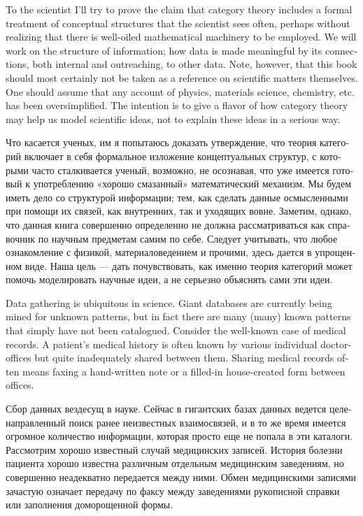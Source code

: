 \documentclass{book}
\theoremstyle{theoremENG}
\theoremstyle{lemmaENG}
\theoremstyle{propositionENG}
\theoremstyle{corollaryENG}
\theoremstyle{factENG}
\theoremstyle{remarkENG}
\theoremstyle{exampleENG}
\theoremstyle{warningENG}
\theoremstyle{questionENG}
\theoremstyle{guessENG}
\theoremstyle{answerENG}
\theoremstyle{constructionENG}
\theoremstyle{rulesENG}
\theoremstyle{excENG}
\theoremstyle{appENG}
\theoremstyle{definitionENG}
\theoremstyle{notationENG}
\theoremstyle{conjectureENG}
\theoremstyle{postulateENG}
\theoremstyle{theoremRUS}
\theoremstyle{lemmaRUS}
\theoremstyle{propositionRUS}
\theoremstyle{corollaryRUS}
\theoremstyle{factRUS}
\theoremstyle{remarkRUS}
\theoremstyle{exampleRUS}
\theoremstyle{warningRUS}
\theoremstyle{questionRUS}
\theoremstyle{guessRUS}
\theoremstyle{answerRUS}
\theoremstyle{constructionRUS}
\theoremstyle{rulesRUS}
\theoremstyle{excRUS}
\theoremstyle{appRUS}
\theoremstyle{definitionRUS}
\theoremstyle{notationRUS}
\theoremstyle{conjectureRUS}
\theoremstyle{postulateRUS}
\begin{document}
\begin{english}
To the scientist I'll try to prove the claim that category theory includes a formal treatment of conceptual structures that the scientist sees often, perhaps without realizing that there is well-oiled mathematical machinery to be employed. We will work on the structure of information; how data is made meaningful by its connections, both internal and outreaching, to other data. Note, however, that this book should most certainly not be taken as a reference on scientific matters themselves. One should assume that any account of physics, materials science, chemistry, etc. has been oversimplified. The intention is to give a flavor of how category theory may help us model scientific ideas, not to explain these ideas in a serious way.

\begin{russian}Что касается ученых, им я попытаюсь доказать утверждение, что теория категорий включает в себя формальное изложение концептуальных структур, с которыми часто сталкивается ученый, возможно, не осознавая, что уже имеется готовый к употреблению «хорошо смазанный» математический механизм. Мы будем иметь дело со структурой информации; тем, как сделать данные осмысленными при помощи их связей, как внутренних, так и уходящих вовне. Заметим, однако, что данная книга совершенно определенно не должна рассматриваться как справочник по научным предметам самим по себе. Следует учитывать, что любое ознакомление с физикой, материаловедением и прочими, здесь дается в упрощенном виде. Наша цель — дать почувствовать, как именно теория категорий может помочь моделировать научные идеи, а не серьезно объяснять сами эти идеи. \end{russian}

Data gathering is ubiquitous in science. Giant databases are currently being mined for unknown patterns, but in fact there are many (many) known patterns that simply have not been catalogued. Consider the well-known case of medical records. A patient's medical history is often known by various individual doctor-offices but quite inadequately shared between them. Sharing medical records often means faxing a hand-written note or a filled-in house-created form between offices.

\begin{russian}Сбор данных вездесущ в науке. Сейчас в гигантских базах данных ведется целенаправленный поиск ранее неизвестных взаимосвязей, и в то же время имеется огромное количество информации, которая просто еще не попала в эти каталоги. Рассмотрим хорошо известный случай медицинских записей. История болезни пациента хорошо известна различным отдельным медицинским заведениям, но совершенно неадекватно передается между ними. Обмен медицинскими записями зачастую означает передачу по факсу между заведениями рукописной справки или заполнения доморощенной формы. \end{russian}


\end{english}
\end{document}
